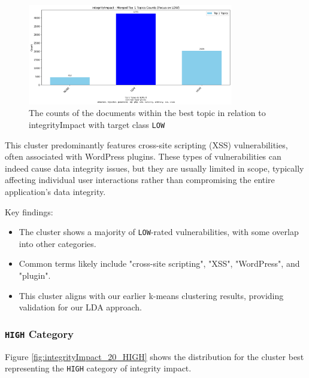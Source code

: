 \documentclass[12pt]{article}
\begin{document}
\begin{figure}[ht]
	\centering
	\includegraphics[width=0.8\textwidth]{figures/integrityImpact/merged_top_k_topics_category_focus_counts_integrityImpact_LOW_k1.png}
	\caption{The counts of the documents within the best topic in relation to integrityImpact with target class \texttt{LOW}}
	\label{fig:integrityImpact_20_LOW}
\end{figure}

This cluster predominantly features cross-site scripting (XSS) vulnerabilities, often associated
with WordPress plugins. These types of vulnerabilities can indeed cause data integrity issues, but
they are usually limited in scope, typically affecting individual user interactions rather than
compromising the entire application's data integrity.

Key findings:
\begin{itemize}

	\item The cluster shows a majority of \texttt{LOW}-rated vulnerabilities, with some overlap into
	      other categories.

	\item Common terms likely include "cross-site scripting", "XSS", "WordPress", and "plugin".

	\item This cluster aligns with our earlier k-means clustering results, providing validation for
	      our LDA approach.

\end{itemize}

\subsubsection{\texttt{HIGH} Category}

Figure \ref{fig:integrityImpact_20_HIGH} shows the distribution for the cluster best representing the \texttt{HIGH} category of integrity impact.
\end{document}
